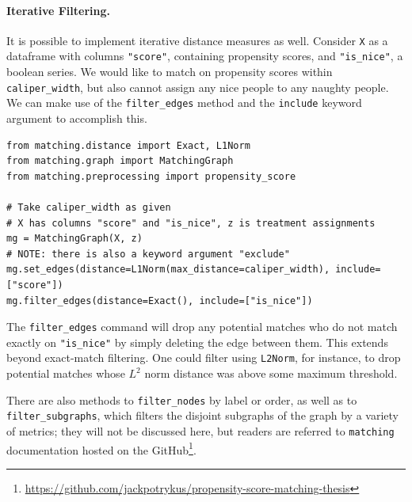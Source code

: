 \documentclass[11pt]{extarticle}
\begin{document}
\paragraph{Iterative Filtering.} It is possible to implement iterative distance measures as well. Consider \texttt{X} as a dataframe with columns \texttt{"score"}, containing propensity scores, and \texttt{"is\_nice"}, a boolean series. We would like to match on propensity scores within \texttt{caliper\_width}, but also cannot assign any nice people to any naughty people. We can make use of the \texttt{filter\_edges} method and the \texttt{include} keyword argument to accomplish this.
\begin{verbatim}
from matching.distance import Exact, L1Norm
from matching.graph import MatchingGraph
from matching.preprocessing import propensity_score

# Take caliper_width as given
# X has columns "score" and "is_nice", z is treatment assignments
mg = MatchingGraph(X, z)
# NOTE: there is also a keyword argument "exclude"
mg.set_edges(distance=L1Norm(max_distance=caliper_width), include=["score"])
mg.filter_edges(distance=Exact(), include=["is_nice"])
\end{verbatim}
The \texttt{filter\_edges} command will drop any potential matches who do not match exactly on \texttt{"is\_nice"} by simply deleting the edge between them. This extends beyond exact-match filtering. One could filter using \texttt{L2Norm}, for instance, to drop potential matches whose $L^2$ norm distance was above some maximum threshold.

There are also methods to \texttt{filter\_nodes} by label or order, as well as to \texttt{filter\_subgraphs}, which filters the disjoint subgraphs of the graph by a variety of metrics; they will not be discussed here, but readers are referred to \texttt{matching} documentation hosted on the GitHub\footnote{\url{https://github.com/jackpotrykus/propensity-score-matching-thesis}}.
\end{document}
